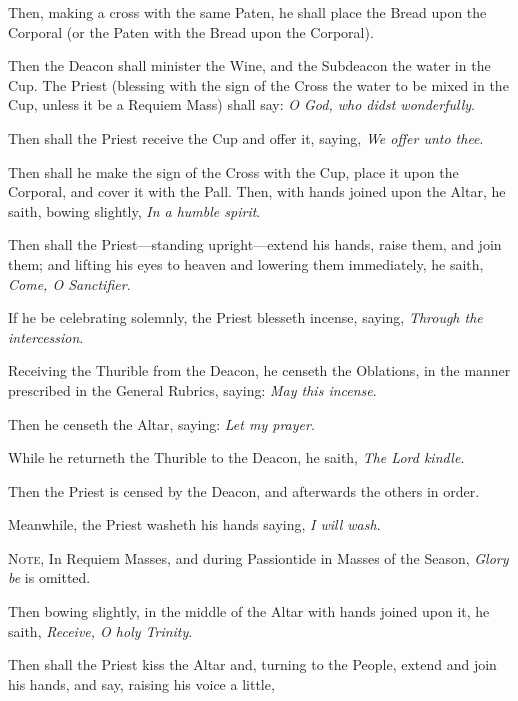 \begin{multicols}{2}
\begin{rubric} 
    Then, making a cross with the same Paten, he shall place the Bread upon the Corporal (or the Paten with the Bread upon the Corporal).
\end{rubric}
\begin{rubric}
	Then the Deacon shall minister the Wine, and the Subdeacon the water in the Cup. The Priest (blessing with the sign of the Cross the water to be mixed in the Cup, unless it be a Requiem Mass) shall say: \emph{O God, who didst wonderfully}.
\end{rubric}
\begin{rubric}
    Then shall the Priest receive the Cup and offer it, saying, \emph{We offer unto thee}.
\end{rubric}
\begin{rubric}
    Then shall he make the sign of the Cross with the Cup, place it upon the Corporal, and cover it with the Pall. Then, with hands joined upon the Altar, he saith, bowing slightly, \emph{In a humble spirit}.
\end{rubric}
\begin{rubric}
    Then shall the Priest---standing upright---extend his hands, raise them, and join them; and lifting his eyes to heaven and lowering them immediately, he saith, \emph{Come, O Sanctifier}.
\end{rubric}
\begin{rubric}
    If he be celebrating solemnly, the Priest blesseth incense, saying, \emph{Through the intercession}.
\end{rubric}
\begin{rubric}
    Receiving the Thurible from the Deacon, he censeth the Oblations, in the manner prescribed in the General Rubrics, saying: \emph{May this incense}.\par
    Then he censeth the Altar, saying: \emph{Let my prayer}.\par
    While he returneth the Thurible to the Deacon, he saith, \emph{The Lord kindle}.\par
    Then the Priest is censed by the Deacon, and afterwards the others in order.
\end{rubric}
\begin{rubric}
    Meanwhile, the Priest washeth his hands saying, \emph{I will wash}.\par
    \textsc{Note,} In Requiem Masses, and during Passiontide in Masses of the Season, \emph{Glory be} is omitted.
\end{rubric}
\begin{rubric}
    Then bowing slightly, in the middle of the Altar with hands joined upon it, he saith, \emph{Receive, O holy Trinity}.
\end{rubric}
\end{multicols}
\begin{rubric}
    Then shall the Priest kiss the Altar and, turning to the People, extend and join his hands, and say, raising his voice a little,
\end{rubric}

